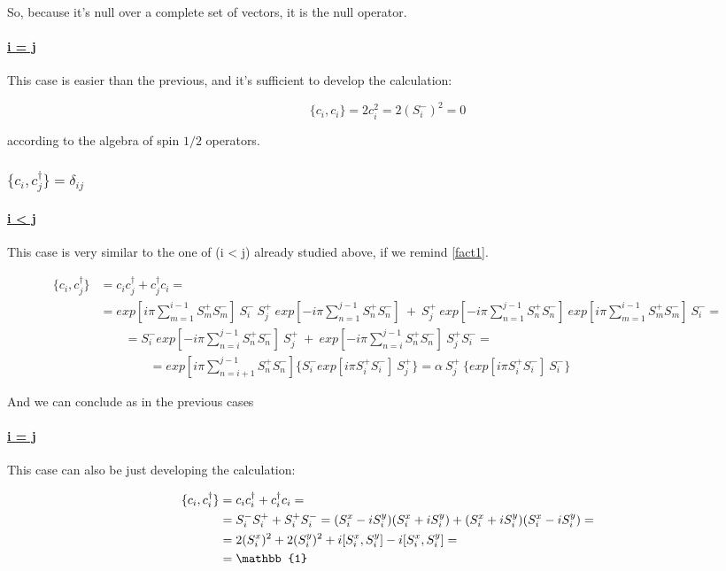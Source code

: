 \documentclass[a4paper,10pt]{article}
\begin{document}
So, because it's null over a complete set of vectors, it is the null operator.

\paragraph{\underline{i = j}} This case is easier than the previous, and it's sufficient to develop the calculation:

\begin{equation*}
\{c_i, c_i\} = 2 c_i^2 = 2 (S_i^-)^2 = 0
\end{equation*}

\noindent according to the algebra of spin $1/2$ operators.

\subsubsection{$\{c_i, c_j^\dagger\} = \delta_{ij}$}

\paragraph{\underline{i < j}} This case is very similar to the one of (i < j) already studied above, if we remind \cref{fact1}.

\begin{align*}
\{c_i, c_j^\dagger\} &= c_i c_j^\dagger + c_j^\dagger c_i =\\
&= exp[i\pi \sum_{m=1}^{i-1} S_m^+ S_m^-]~S_i^- ~S_j^+ ~exp[-i\pi \sum_{n=1}^{j-1} S_n^+ S_n^-] ~+~ S_j^+ ~exp[-i\pi \sum_{n=1}^{j-1} S_n^+ S_n^-]~ exp[i\pi \sum_{m=1}^{i-1} S_m^+ S_m^-]~S_i^- =\\
& \qquad  = S_i^- exp[- i\pi \sum_{n=i}^{j-1} S_n^+ S_n^-]~S_j^+ ~+~ exp[- i\pi \sum_{n=i}^{j-1} S_n^+ S_n^-]~S_j^+ S_i^- =\\
& \qquad \qquad = exp[i\pi \sum_{n=i+1}^{j-1} S_n^+ S_n^-] \{S_i^- exp[i\pi S_i^+ S_i^-]~S_j^+\} = \alpha ~S_j^+ ~\{exp[i\pi S_i^+ S_i^-]~S_i^-\}
\end{align*}

\noindent And we can conclude as in the previous cases

\paragraph{\underline{i = j}} This case can also be just developing the calculation:

\begin{align*}
\{c_i, c_i^\dagger\} &= c_i c_i^\dagger + c_i^\dagger c_i =\\
&= S_i^- S_i^+ + S_i^+ S_i^- = (S_i^x - iS_i^y)(S_i^x + iS_i^y) + (S_i^x + iS_i^y)(S_i^x - iS_i^y) =\\
&= 2(S_i^x)^2 + 2(S_i^y)^2 + i\comm{S_i^x}{S_i^y} - i\comm{S_i^x}{S_i^y} =\\
&= \mathbb{1}
\end{align*}
\end{document}
